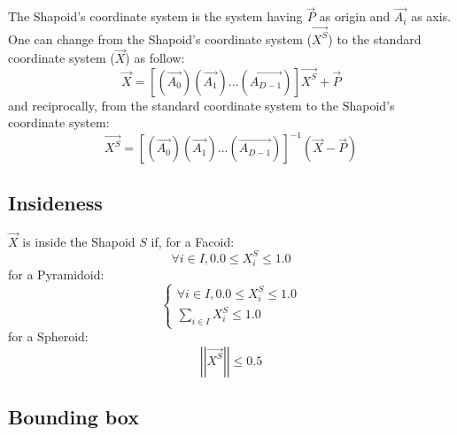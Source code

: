 \documentclass[12pt, a4paper]{article}
\begin{document}
The Shapoid's coordinate system is the system having $\overrightarrow{P}$ as origin and $\overrightarrow{A_i}$ as axis. One can change from the Shapoid's coordinate system ($\overrightarrow{X^S}$) to the standard coordinate system ($\overrightarrow{X}$) as follow:\\
\begin{equation}
\overrightarrow{X}=\left[\left(\overrightarrow{A_0}\right)\left(\overrightarrow{A_1}\right)...\left(\overrightarrow{A_{D-1}}\right)\right]\overrightarrow{X^S}+\overrightarrow{P}
\end{equation}
and reciprocally, from the standard coordinate system to the Shapoid's coordinate system:\\
\begin{equation}
\overrightarrow{X^S}=\left[\left(\overrightarrow{A_0}\right)\left(\overrightarrow{A_1}\right)...\left(\overrightarrow{A_{D-1}}\right)\right]^{-1}\left(\overrightarrow{X}-\overrightarrow{P}\right)
\end{equation}

\subsection{Insideness}

$\overrightarrow{X}$ is inside the Shapoid $S$ if, for a Facoid:\\
\begin{equation}
\forall i\in I,0.0\le X_i^S\le1.0
\end{equation}
for a Pyramidoid:\\
\begin{equation}
\left\lbrace\begin{array}{l}
\forall i\in I,0.0\le X_i^S\le1.0\\
\sum_{i\in I}X_i^S\le1.0
\end{array}\right.
\end{equation}
for a Spheroid:\\
\begin{equation}
\left|\left|\overrightarrow{X^S}\right|\right|\le0.5
\end{equation}

\subsection{Bounding box}
\end{document}
